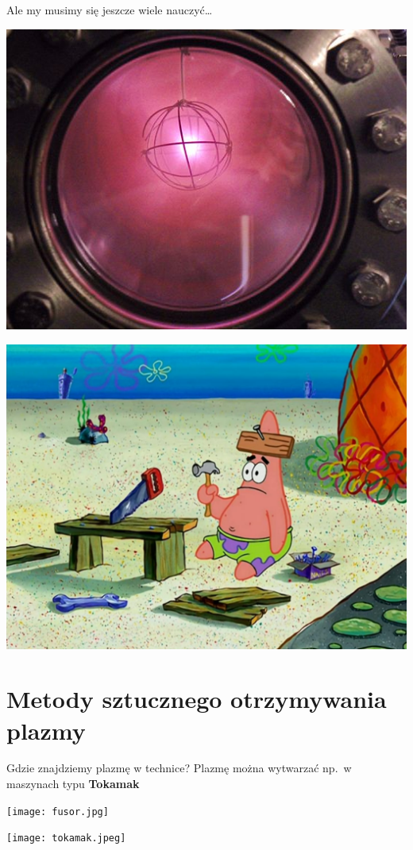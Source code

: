 \documentclass[10pt]{beamer}
\begin{document}
        \begin{frame}{Ale my musimy się jeszcze wiele nauczyć\dots}
            \begin{minipage}{0.49\textwidth}
                \centering
                \includegraphics[width=0.8\linewidth]{deuterium.jpg}
            \end{minipage}
            \hfill
            \begin{minipage}{0.49\textwidth}
                \centering
                \includegraphics[width=0.8\linewidth]{patrick.jpeg}
            \end{minipage}
        \end{frame}

    \section{Metody sztucznego otrzymywania plazmy}

    \begin{frame}{Gdzie znajdziemy plazmę w technice?}
        Plazmę można wytwarzać np.\ w maszynach typu \textbf{Tokamak} 
        \begin{minipage}{0.49\textwidth}
            \centering
            \texttt{[image: fusor.jpg]}
        \end{minipage}
        \hfill
        \begin{minipage}{0.49\textwidth}
            \centering
            \texttt{[image: tokamak.jpeg]}
        \end{minipage}
    \end{frame}
\end{document}
